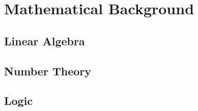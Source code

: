 \chapter{Mathematical Background}
\label{ch:background}
\section{Linear Algebra}



\section{Number Theory}




\section{Logic}




